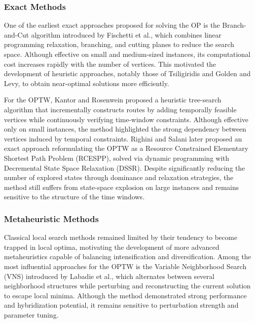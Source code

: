 \subsubsection*{Exact Methods}

One of the earliest exact approaches proposed for solving the OP is the Branch-and-Cut algorithm introduced by Fischetti et al.\cite{fischetti_solving_1998}, which combines linear programming relaxation, branching, and cutting planes to reduce the search space. Although effective on small and medium-sized instances, its computational cost increases rapidly with the number of vertices. This motivated the development of heuristic approaches, notably those of Tsiligiridis\cite{Tsiligiridis} and Golden and Levy\cite{golden}, to obtain near-optimal solutions more efficiently.

For the OPTW, Kantor and Rosenwein\cite{77719d57-9aea-3d04-aeff-58a2183cbee5} proposed a heuristic tree-search algorithm that incrementally constructs routes by adding temporally feasible vertices while continuously verifying time-window constraints. Although effective only on small instances, the method highlighted the strong dependency between vertices induced by temporal constraints. Righini and Salani later\cite{RIGHINI20091191} proposed an exact approach reformulating the OPTW as a Resource Constrained Elementary Shortest Path Problem (RCESPP), solved via dynamic programming with Decremental State Space Relaxation (DSSR). Despite significantly reducing the number of explored states through dominance and relaxation strategies, the method still suffers from state-space explosion on large instances and remains sensitive to the structure of the time windows.

\subsubsection*{Metaheuristic Methods}

Classical local search methods remained limited by their tendency to become trapped in local optima, motivating the development of more advanced metaheuristics capable of balancing intensification and diversification. Among the most influential approaches for the OPTW is the Variable Neighborhood Search (VNS) introduced by Labadie et al.\cite{LABADIE201215}, which alternates between several neighborhood structures while perturbing and reconstructing the current solution to escape local minima. Although the method demonstrated strong performance and hybridization potential, it remains sensitive to perturbation strength and parameter tuning.

